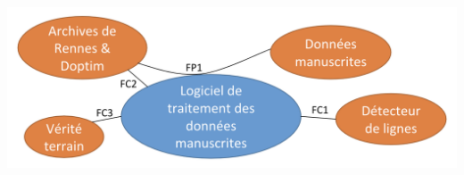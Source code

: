 \paragraph{}
\begin{mdframed}
\begin{center}
\includegraphics[width=0.7\linewidth]{pieuvre.png}
\end{center}
\end{mdframed}